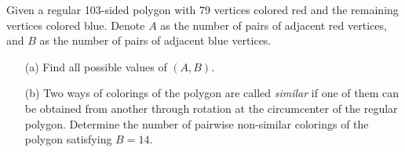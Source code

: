 \documentclass[11pt]{article}
\theoremstyle{definition}
\begin{document}
        \newpage

        \begin{problem}
            Given a regular 103-sided polygon with 79 vertices colored red and the remaining vertices colored blue. Denote \(A\) as the number of pairs of adjacent red vertices, and \(B\) as the number of pairs of adjacent blue vertices.
            \begin{enumerate}
                \item[(a)] Find all possible values of \((A,B)\).
                \item[(b)] Two ways of colorings of the polygon are called \emph{similar} if one of them can be obtained from another through rotation at the circumcenter of the regular polygon. Determine the number of pairwise non-similar colorings of the polygon satisfying \(B = 14\).
            \end{enumerate}
        \end{problem}
        
\end{document}
